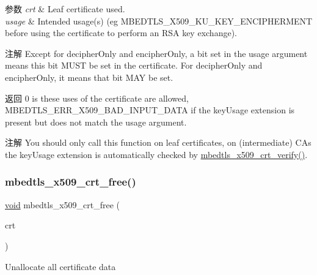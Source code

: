 \begin{DoxyParams}{参数}
{\em crt} & Leaf certificate used. \\
\hline
{\em usage} & Intended usage(s) (eg M\+B\+E\+D\+T\+L\+S\+\_\+\+X509\+\_\+\+K\+U\+\_\+\+K\+E\+Y\+\_\+\+E\+N\+C\+I\+P\+H\+E\+R\+M\+E\+NT before using the certificate to perform an R\+SA key exchange).\\
\hline
\end{DoxyParams}
\begin{DoxyNote}{注解}
Except for decipher\+Only and encipher\+Only, a bit set in the usage argument means this bit M\+U\+ST be set in the certificate. For decipher\+Only and encipher\+Only, it means that bit M\+AY be set.
\end{DoxyNote}
\begin{DoxyReturn}{返回}
0 is these uses of the certificate are allowed, M\+B\+E\+D\+T\+L\+S\+\_\+\+E\+R\+R\+\_\+\+X509\+\_\+\+B\+A\+D\+\_\+\+I\+N\+P\+U\+T\+\_\+\+D\+A\+TA if the key\+Usage extension is present but does not match the usage argument.
\end{DoxyReturn}
\begin{DoxyNote}{注解}
You should only call this function on leaf certificates, on (intermediate) C\+As the key\+Usage extension is automatically checked by {\ttfamily \hyperlink{group__x509__module_ga98ed4504e4f832b735a230acf54fcde3}{mbedtls\+\_\+x509\+\_\+crt\+\_\+verify()}}. 
\end{DoxyNote}
\mbox{\label{group__x509__module_gab33c1e4e20bea7ce536119f54a113c6b}} 
\subsubsection{\texorpdfstring{mbedtls\+\_\+x509\+\_\+crt\+\_\+free()}{mbedtls\_x509\_crt\_free()}}
{\footnotesize\ttfamily \hyperlink{interfacevoid}{void} mbedtls\+\_\+x509\+\_\+crt\+\_\+free (\begin{DoxyParamCaption}\item[{\hyperlink{structmbedtls__x509__crt}{mbedtls\+\_\+x509\+\_\+crt} $\ast$}]{crt }\end{DoxyParamCaption})}



Unallocate all certificate data 


